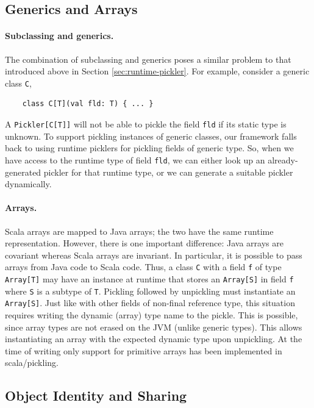 \documentclass[preprint,10pt]{sigplanconf}
\theoremstyle{definition}
\theoremstyle{definition}
\newcommand{\term}[1]{\mbox{\texttt{#1}}}
\begin{document}
\subsection{Generics and Arrays}

\paragraph{Subclassing and generics.} The combination of subclassing and generics
poses a similar problem to that introduced above in Section \ref{sec:runtime-pickler}.
For example, consider a generic class \term{C},

\begin{lstlisting}
    class C[T](val fld: T) { ... }
\end{lstlisting}

A \term{Pickler[C[T]]} will not be able to pickle the field \term{fld} if its
static type is unknown. To support pickling instances of generic classes, our
framework falls back to using runtime picklers for pickling fields of generic
type. So, when we have access to the runtime type of field \term{fld}, we can
either look up an already-generated pickler for that runtime type, or we can
generate a suitable pickler dynamically.

\paragraph{Arrays.} Scala arrays are mapped to Java arrays;  the two have the
same runtime representation. However, there is one important difference: Java
arrays are covariant whereas Scala arrays are invariant. In particular, it is
possible to pass arrays from Java code to Scala code. Thus, a class \verb|C|
with a field \verb|f| of type \verb|Array[T]| may have an instance at runtime
that stores an \verb|Array[S]| in field \verb|f| where \verb|S| is a subtype
of \verb|T|. Pickling followed by unpickling must instantiate an
\verb|Array[S]|. Just like with other fields of non-final reference type, this
situation requires writing the dynamic (array) type name to the pickle. This
is possible, since array types are not erased on the JVM (unlike generic
types). This allows instantiating an array with the expected dynamic type upon
unpickling. At the time of writing only support for primitive arrays has been
implemented in scala/pickling.


\subsection{Object Identity and Sharing}
\label{sec:object-identity}
\end{document}
